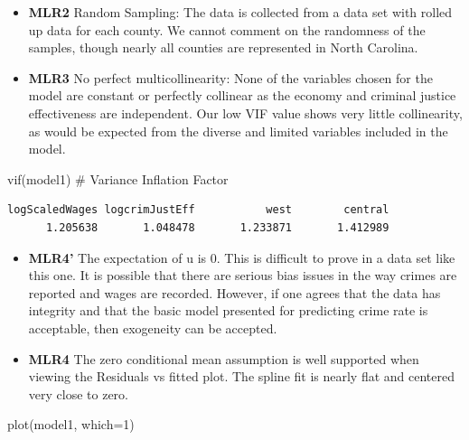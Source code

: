 \documentclass[]{article}
\newenvironment{Shaded}{}{}
\newcommand{\CommentTok}[1]{\textcolor[rgb]{0.00,0.50,0.00}{#1}}
\newcommand{\DataTypeTok}[1]{#1}
\newcommand{\DecValTok}[1]{#1}
\newcommand{\KeywordTok}[1]{\textcolor[rgb]{0.00,0.00,1.00}{#1}}
\newcommand{\NormalTok}[1]{#1}
\begin{document}
\begin{itemize}
\item
  \textbf{MLR2} Random Sampling: The data is collected from a data set
  with rolled up data for each county. We cannot comment on the
  randomness of the samples, though nearly all counties are represented
  in North Carolina.
\item
  \textbf{MLR3} No perfect multicollinearity: None of the variables
  chosen for the model are constant or perfectly collinear as the
  economy and criminal justice effectiveness are independent. Our low
  VIF value shows very little collinearity, as would be expected from
  the diverse and limited variables included in the model.
\end{itemize}

\begin{Shaded}
\begin{Highlighting}[]
\KeywordTok{vif}\NormalTok{(model1) }\CommentTok{# Variance Inflation Factor}
\end{Highlighting}
\end{Shaded}

\begin{verbatim}
logScaledWages logcrimJustEff           west        central 
      1.205638       1.048478       1.233871       1.412989 
\end{verbatim}

\begin{itemize}
\item
  \textbf{MLR4'} The expectation of u is 0. This is difficult to prove
  in a data set like this one. It is possible that there are serious
  bias issues in the way crimes are reported and wages are recorded.
  However, if one agrees that the data has integrity and that the basic
  model presented for predicting crime rate is acceptable, then
  exogeneity can be accepted.
\item
  \textbf{MLR4} The zero conditional mean assumption is well supported
  when viewing the Residuals vs fitted plot. The spline fit is nearly
  flat and centered very close to zero.
\end{itemize}

\begin{Shaded}
\begin{Highlighting}[]
\KeywordTok{plot}\NormalTok{(model1, }\DataTypeTok{which=}\DecValTok{1}\NormalTok{)}
\end{Highlighting}
\end{Shaded}
\end{document}
